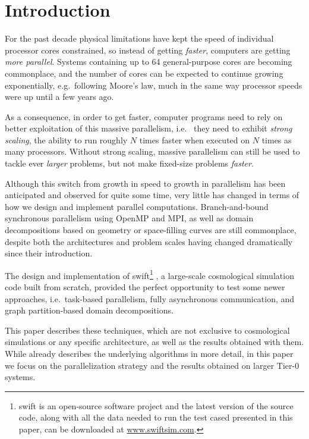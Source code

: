 \documentclass{sig-alternate-05-2015}
\newcommand{\swift}{{\sc swift}\xspace}
\newcommand{\web}{\url{www.swiftsim.com}}
\begin{document}


\section{Introduction}

For the past decade physical limitations have kept the speed of
individual processor cores constrained, so instead of getting {\em
  faster}, computers are getting {\em more parallel}.  Systems
containing up to 64 general-purpose cores are becoming commonplace,
and the number of cores can be expected to continue growing
exponentially, e.g.~following Moore's law, much in the same way
processor speeds were up until a few years ago.

As a consequence, in order to get faster, computer programs need to
rely on better exploitation of this massive parallelism, i.e.~ they
need to exhibit {\em strong scaling}, the ability to run roughly $N$
times faster when executed on $N$ times as many processors.  Without
strong scaling, massive parallelism can still be used to tackle ever
{\em larger} problems, but not make fixed-size problems {\em faster}.

Although this switch from growth in speed to growth in parallelism
has been anticipated and observed for quite some time, very little
has changed in terms of how we design and implement parallel
computations.
Branch-and-bound synchronous parallelism using
OpenMP\cite{ref:Dagum1998} and MPI\cite{ref:Snir1998}, as well as domain
decompositions based on geometry or space-filling curves \cite{warren1993parallel}
are still commonplace, despite both the
architectures and problem scales having changed dramatically since
their introduction.

The design and implementation of \swift\footnote{
\swift is an open-source software project and the latest version of
the source code, along with all the data needed to run the test cased
presented in this paper, can be downloaded at \web.}
\cite{gonnet2013swift,theuns2015swift,ref:Gonnet2015}, a large-scale
cosmological simulation code built from scratch, provided the perfect
opportunity to test some newer
approaches, i.e.~task-based parallelism, fully asynchronous communication, and
graph partition-based domain decompositions.

This paper describes these techniques, which are not exclusive to
cosmological simulations or any specific architecture, as well as
the results obtained with them.
While \cite{gonnet2013swift,ref:Gonnet2015} already describes the underlying algorithms
in more detail, in this paper we focus on the parallelization strategy
and the results obtained  on larger Tier-0 systems.
\end{document}
